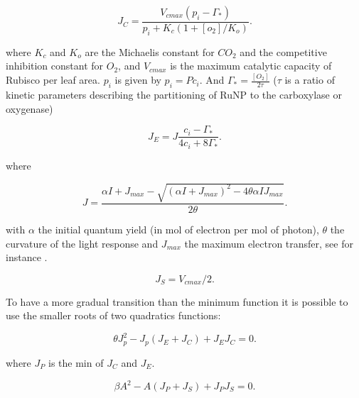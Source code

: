 \documentclass[a4paper,11pt]{article}
\begin{document}


\begin{equation}
\label{eq:JC}
J_C= \frac{V_{cmax} (p_i - \Gamma_*)}{p_i + K_c (1+[o_2]/K_o)}.
\end{equation}

where $K_c$ and $K_o$ are the Michaelis constant for $CO_2$ and the competitive inhibition constant for $O_2$, and $V_{cmax}$ is the maximum catalytic capacity of Rubisco per leaf area.
$p_i$ is given by $p_i = P c_i$. And $\Gamma_* = \frac{[O_2]}{2\tau}$ ($\tau$ is a ratio of kinetic parameters describing the partitioning of RuNP to the carboxylase or oxygenase)

\begin{equation}
\label{eq:JCb}
J_E = J \frac{ c_i - \Gamma_*}{4c_i + 8 \Gamma_*}.
\end{equation}

where

\begin{equation}
\label{eq:Jlight}
J = \frac{ \alpha I + J_{max} - \sqrt{(\alpha I + J_{max})^2 - 4 \theta \alpha I J_{max}}}{2\theta}.
\end{equation}

with $\alpha$ the initial quantum yield (in mol of electron per mol of photon), $\theta$ the curvature of the light response and $J_{max}$ the maximum electron transfer,
see for instance \citet{Bernacchi-2009}.


\begin{equation}
\label{eq:JS}
J_S= V_{cmax}/2.
\end{equation}

To have a more gradual transition than the minimum function it is possible to use the smaller roots of two quadratics functions:

\begin{equation}
\label{eq:Q1}
\theta J_p^2 - J_p(J_E+J_C) + J_E J_C= 0.
\end{equation}

where $J_P$ is the min of $J_C$ and $J_E$.

\begin{equation}
\label{eq:Q2}
\beta A^2 - A(J_P+J_S) + J_P J_S= 0.
\end{equation}
\end{document}
